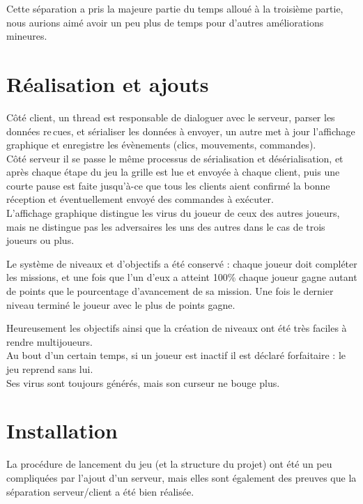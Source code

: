 \documentclass[a4paper,french]{article}
\begin{document}
Cette s\'eparation a pris la majeure partie du temps allou\'e \`a la troisi\`eme partie,
nous aurions aim\'e avoir un peu plus de temps pour d'autres am\'eliorations mineures.



\section{R\'ealisation et ajouts}

C\^ot\'e client, un thread est responsable de dialoguer avec le serveur, parser les donn\'ees re\,cues, et
s\'erialiser les donn\'ees \`a envoyer, un autre met \`a jour l'affichage graphique et enregistre les
\'ev\`enements (clics, mouvements, commandes).\\

C\^ot\'e serveur il se passe le m\^eme processus de s\'erialisation et d\'es\'erialisation, et apr\`es chaque
\'etape du jeu la grille est lue et envoy\'ee \`a chaque client, puis une courte pause est faite jusqu'\`a-ce que
tous les clients aient confirm\'e la bonne r\'eception et \'eventuellement envoy\'e des commandes \`a ex\'ecuter.\\

L'affichage graphique distingue les virus du joueur de ceux des autres joueurs, mais ne distingue pas les 
adversaires les uns des autres dans le cas de trois joueurs ou plus.

Le syst\`eme de niveaux et d'objectifs a \'et\'e conserv\'e : chaque joueur doit compl\'eter les missions,
et une fois que l'un d'eux a atteint 100\% chaque joueur gagne autant de points que le pourcentage d'avancement
de sa mission. Une fois le dernier niveau termin\'e le joueur avec le plus de points gagne.

Heureusement les objectifs ainsi que la cr\'eation de niveaux ont \'et\'e tr\`es faciles \`a rendre multijoueurs.\\

Au bout d'un certain temps, si un joueur est inactif il est d\'eclar\'e forfaitaire : le jeu reprend sans lui.\\
Ses virus sont toujours g\'en\'er\'es, mais son curseur ne bouge plus.\\


\section{Installation}

La proc\'edure de lancement du jeu (et la structure du projet) ont \'et\'e un peu compliqu\'ees par l'ajout d'un serveur,
mais elles sont \'egalement des preuves que la s\'eparation serveur/client a \'et\'e bien r\'ealis\'ee.
\end{document}
